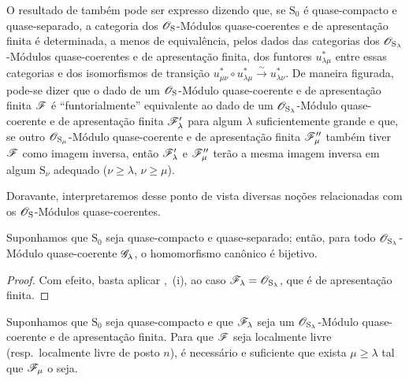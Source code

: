 \begin{env}[8.5.3]
\label{IV.8.5.3}
O resultado de  também pode ser expresso dizendo que, se $\mathrm{S}_0$ é quase-compacto e quase-separado, a categoria dos $\mathscr{O}_\mathrm{S}$-Módulos quase-coerentes e de apresentação finita é determinada, a menos de equivalência, pelos dados das categorias dos $\mathscr{O}_{\mathrm{S}_\lambda}$-Módulos quase-coerentes e de apresentação finita, dos funtores $u_{\lambda\mu}^*$ entre essas categorias e dos isomorfismos de transição $u_{\mu\nu}^*\circ u_{\lambda\mu}^*\xrightarrow{\sim}u_{\lambda\nu}^*$.
De maneira figurada, pode-se dizer que o dado de um $\mathscr{O}_\mathrm{S}$-Módulo quase-coerente e de apresentação finita $\mathscr{F}$ é ``funtorialmente'' equivalente ao dado de um $\mathscr{O}_{\mathrm{S}_\lambda}$-Módulo quase-coerente e de apresentação finita $\mathscr{F}'_\lambda$ para algum $\lambda$ suficientemente grande e que, se outro $\mathscr{O}_{\mathrm{S}_\mu}$-Módulo quase-coerente e de apresentação finita $\mathscr{F}''_\mu$ também tiver $\mathscr{F}$ como imagem inversa, então $\mathscr{F}'_\lambda$ e $\mathscr{F}''_\mu$ terão a mesma imagem inversa em algum $\mathrm{S}_\nu$ adequado ($\nu\geqslant\lambda$, $\nu\geqslant\mu$).

Doravante, interpretaremos desse ponto de vista diversas noções relacionadas com os $\mathscr{O}_\mathrm{S}$-Módulos quase-coerentes.
\end{env}

\begin{corollary}[8.5.4]
\label{IV.8.5.4}
Suponhamos que $\mathrm{S}_0$ seja quase-compacto e quase-separado; então, para todo $\mathscr{O}_{\mathrm{S}_\lambda}$-Módulo quase-coerente $\mathscr{G}_\lambda$, o homomorfismo canônico  é bijetivo.
\end{corollary}

\begin{proof}
Com efeito, basta aplicar ,~(i), ao caso $\mathscr{F}_\lambda=\mathscr{O}_{\mathrm{S}_\lambda}$, que é de apresentação finita.
\end{proof}

\begin{proposition}[8.5.5]
\label{IV.8.5.5}
Suponhamos que $\mathrm{S}_0$ seja quase-compacto e que $\mathscr{F}_\lambda$ seja um $\mathscr{O}_{\mathrm{S}_\lambda}$-Módulo quase-coerente e de apresentação finita.
Para que $\mathscr{F}$ seja localmente livre (resp.\ localmente livre de posto $n$), é necessário e suficiente que exista $\mu\geqslant\lambda$ tal que $\mathscr{F}_\mu$ o seja.
\end{proposition}

